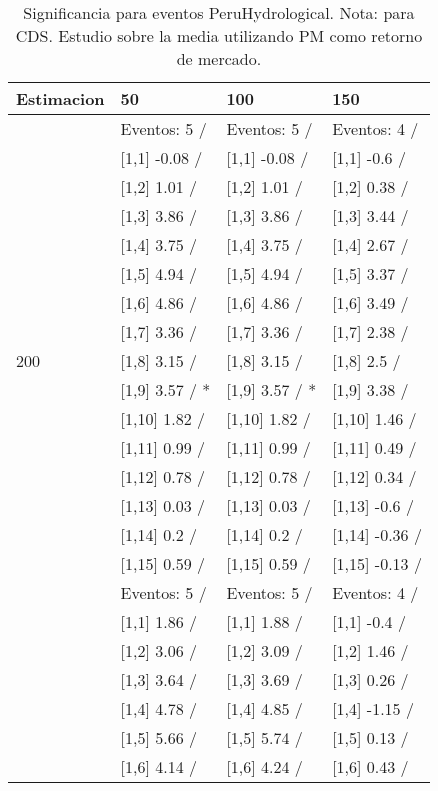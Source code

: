 \begin{table}

\caption{Significancia para eventos PeruHydrological. Nota: para CDS. Estudio sobre la media utilizando PM como retorno de mercado.}
\centering
\begin{tabular}[t]{llll}
\toprule
Estimacion & 50 & 100 & 150\\
\midrule
 & Eventos:  5 / & Eventos:  5 / & Eventos:  4 /\\
 & {}[1,1] -0.08  / & {}[1,1] -0.08  / & {}[1,1] -0.6  /\\
 & {}[1,2] 1.01  / & {}[1,2] 1.01  / & {}[1,2] 0.38  /\\
 & {}[1,3] 3.86  / & {}[1,3] 3.86  / & {}[1,3] 3.44  /\\
 & {}[1,4] 3.75  / & {}[1,4] 3.75  / & {}[1,4] 2.67  /\\
\addlinespace
 & {}[1,5] 4.94  / & {}[1,5] 4.94  / & {}[1,5] 3.37  /\\
 & {}[1,6] 4.86  / & {}[1,6] 4.86  / & {}[1,6] 3.49  /\\
 & {}[1,7] 3.36  / & {}[1,7] 3.36  / & {}[1,7] 2.38  /\\
200 & {}[1,8] 3.15  / & {}[1,8] 3.15  / & {}[1,8] 2.5  /\\
 & {}[1,9] 3.57  / * & {}[1,9] 3.57  / * & {}[1,9] 3.38  /\\
\addlinespace
 & {}[1,10] 1.82  / & {}[1,10] 1.82  / & {}[1,10] 1.46  /\\
 & {}[1,11] 0.99  / & {}[1,11] 0.99  / & {}[1,11] 0.49  /\\
 & {}[1,12] 0.78  / & {}[1,12] 0.78  / & {}[1,12] 0.34  /\\
 & {}[1,13] 0.03  / & {}[1,13] 0.03  / & {}[1,13] -0.6  /\\
 & {}[1,14] 0.2  / & {}[1,14] 0.2  / & {}[1,14] -0.36  /\\
\addlinespace
 & {}[1,15] 0.59  / & {}[1,15] 0.59  / & {}[1,15] -0.13  /\\
 & Eventos:  5 / & Eventos:  5 / & Eventos:  4 /\\
 & {}[1,1] 1.86  / & {}[1,1] 1.88  / & {}[1,1] -0.4  /\\
 & {}[1,2] 3.06  / & {}[1,2] 3.09  / & {}[1,2] 1.46  /\\
 & {}[1,3] 3.64  / & {}[1,3] 3.69  / & {}[1,3] 0.26  /\\
\addlinespace
 & {}[1,4] 4.78  / & {}[1,4] 4.85  / & {}[1,4] -1.15  /\\
 & {}[1,5] 5.66  / & {}[1,5] 5.74  / & {}[1,5] 0.13  /\\
 & {}[1,6] 4.14  / & {}[1,6] 4.24  / & {}[1,6] 0.43  /\\

\end{tabular}
\end{table}
